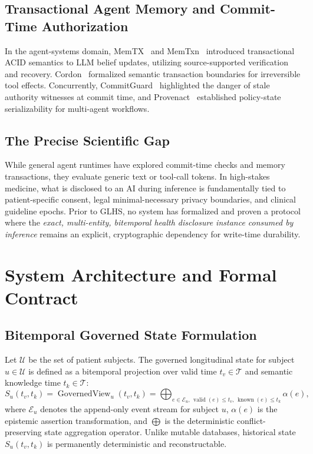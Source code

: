 \documentclass[11pt,a4paper]{article}
\begin{document}
\subsection{Transactional Agent Memory and Commit-Time Authorization}
In the agent-systems domain, MemTX~\cite{memtx} and MemTxn~\cite{memtxn} introduced transactional ACID semantics to LLM belief updates, utilizing source-supported verification and recovery. Cordon~\cite{cordon} formalized semantic transaction boundaries for irreversible tool effects. Concurrently, CommitGuard~\cite{temporaryauth} highlighted the danger of stale authority witnesses at commit time, and Provenact~\cite{statefulgov} established policy-state serializability for multi-agent workflows.

\subsection{The Precise Scientific Gap}
While general agent runtimes have explored commit-time checks and memory transactions, they evaluate generic text or tool-call tokens. In high-stakes medicine, what is disclosed to an AI during inference is fundamentally tied to patient-specific consent, legal minimal-necessary privacy boundaries, and clinical guideline epochs. Prior to GLHS, no system has formalized and proven a protocol where the \emph{exact, multi-entity, bitemporal health disclosure instance consumed by inference} remains an explicit, cryptographic dependency for write-time durability.

\section{System Architecture and Formal Contract}

\subsection{Bitemporal Governed State Formulation}
Let $\mathcal{U}$ be the set of patient subjects. The governed longitudinal state for subject $u \in \mathcal{U}$ is defined as a bitemporal projection over valid time $t_v \in \mathcal{T}$ and semantic knowledge time $t_k \in \mathcal{T}$:
\begin{equation}
S_u(t_v, t_k) = \operatorname{GovernedView}_u(t_v, t_k) = \bigoplus_{e \in \mathcal{E}_u, \, \operatorname{valid}(e) \le t_v, \, \operatorname{known}(e) \le t_k} \alpha(e),
\label{eq:state_bitemporal}
\end{equation}
where $\mathcal{E}_u$ denotes the append-only event stream for subject $u$, $\alpha(e)$ is the epistemic assertion transformation, and $\bigoplus$ is the deterministic conflict-preserving state aggregation operator. Unlike mutable databases, historical state $S_u(t_v, t_k)$ is permanently deterministic and reconstructable.
\end{document}
